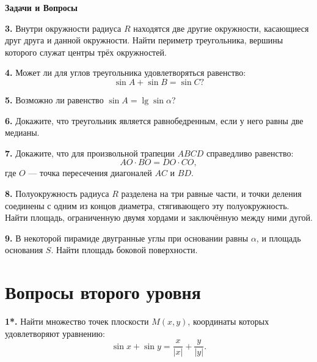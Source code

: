 \setcounter{page}{45}
\begin{center}
    {\Large \textbf{Задачи и Вопросы}}
\end{center}

\textbf{3.} Внутри окружности радиуса \( R \) находятся две другие окружности, касающиеся друг друга и данной окружности. Найти периметр треугольника, вершины которого служат центры трёх окружностей.

\vspace{0.5em}

\textbf{4.} Может ли для углов треугольника удовлетворяться равенство:  
\[
\sin A + \sin B = \sin C?
\]

\vspace{0.5em}

\textbf{5.} Возможно ли равенство \( \sin A = \lg \sin \alpha \)?

\vspace{0.5em}

\textbf{6.} Докажите, что треугольник является равнобедренным, если у него равны две медианы.

\vspace{0.5em}

\textbf{7.} Докажите, что для произвольной трапеции \( ABCD \) справедливо равенство:  
\[
AO \cdot BO = DO \cdot CO,
\]
где \( O \) — точка пересечения диагоналей \( AC \) и \( BD \).

\vspace{0.5em}

\textbf{8.} Полуокружность радиуса \( R \) разделена на три равные части, и точки деления соединены с одним из концов диаметра, стягивающего эту полуокружность. Найти площадь, ограниченную двумя хордами и заключённую между ними дугой.

\vspace{0.5em}

\textbf{9.} В некоторой пирамиде двугранные углы при основании равны $\alpha$, и площадь основания $S$. Найти площадь боковой поверхности.

\section*{Вопросы второго уровня}

\textbf{1*.} Найти множество точек плоскости \( M(x, y) \), координаты которых удовлетворяют уравнению:  
\[
\sin x + \sin y = \frac{x}{\left|x\right|} + \frac{y}{\left|y\right|}.
\]

\vspace{0.5em}


